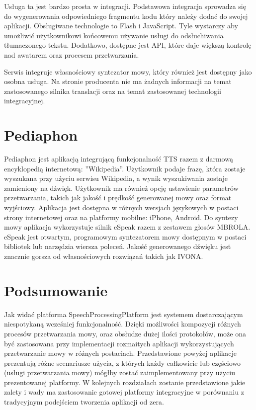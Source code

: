 Usługa ta jest bardzo prosta w integracji. Podstawowa integracja sprowadza się do wygenerowania odpowiedniego fragmentu kodu który należy dodać do swojej aplikacji. Obsługiwane technologie to Flash i JavaScript. Tyle wystarczy aby umożliwić użytkownikowi końcowemu używanie usługi do odsłuchiwania tłumaczonego tekstu. Dodatkowo, dostępne jest API, które daje większą kontrolę nad awatarem oraz procesem przetwarzania. 

Serwis integruje własnościowy syntezator mowy, który również jest dostępny jako osobna usługa. Na stronie producenta nie ma żadnych informacji na temat zastosowanego silnika translacji oraz na temat zastosowanej technologii integracyjnej.

\section {Pediaphon} 

Pediaphon\cite{pediaphon} jest aplikacją integrującą funkcjonalność TTS razem z darmową encyklopedią internetową: ''Wikipedia''. Użytkownik podaje frazę, która zostaje wyszukana przy użyciu serwisu Wikipedia, a wynik wyszukiwania zostaje zamieniony na dźwięk. Użytkownik ma również opcję ustawienie parametrów przetwarzania, takich jak jakość i prędkość generowanej mowy oraz format wyjściowy. Aplikacja jest dostępna w różnych wersjach językowych w postaci strony internetowej oraz na platformy mobilne: iPhone, Android. Do syntezy mowy aplikacja wykorzystuje silnik eSpeak razem z zestawem głosów MBROLA. eSpeak jest otwartym, programowym syntezatorem mowy dostępnym w postaci bibliotek lub narzędzia wiersza poleceń. Jakość generowanego dźwięku jest znacznie gorsza od własnościowych rozwiązań takich jak IVONA.

\section*{Podsumowanie} 
Jak widać platforma SpeechProcessingPlatform jest systemem dostarczającym niespotykaną wcześniej funkcjonalność. Dzięki możliwości kompozycji różnych procesów przetwarzania mowy, oraz obsłudze dużej ilości protokołów, może ona być zastosowana przy implementacji rozmaitych aplikacji wykorzystujących przetwarzanie mowy w różnych postaciach. Przedstawione powyżej aplikacje prezentują różne scenariusze użycia, z których każdy całkowicie lub częściowo (usługi przetwarzania mowy) mógłby zostać zaimplementowany przy użyciu prezentowanej platformy. W kolejnych rozdziałach zostanie przedstawione jakie zalety i wady ma zastosowanie gotowej platformy integracyjne w porównaniu z tradycyjnym podejściem tworzenia aplikacji od zera.






